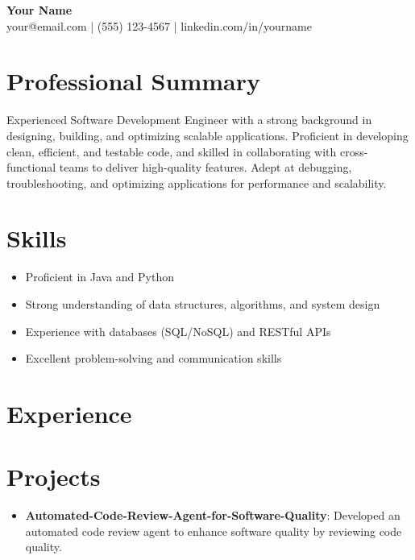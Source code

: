 \documentclass[11pt,a4paper]{article}
\begin{document}
\begin{center}
{\LARGE \textbf{Your Name}} \\[4pt]
your@email.com \quad | \quad (555) 123-4567 \quad | \quad linkedin.com/in/yourname
\end{center}

\vspace{8pt}

\section*{Professional Summary}
Experienced Software Development Engineer with a strong background in designing, building, and optimizing scalable applications. Proficient in developing clean, efficient, and testable code, and skilled in collaborating with cross-functional teams to deliver high-quality features. Adept at debugging, troubleshooting, and optimizing applications for performance and scalability.

\section*{Skills}
\begin{itemize} \item Proficient in Java and Python \item Strong understanding of data structures, algorithms, and system design \item Experience with databases (SQL/NoSQL) and RESTful APIs \item Excellent problem-solving and communication skills \end{itemize}

\section*{Experience}

\section*{Projects}
\begin{itemize} \item \textbf{Automated-Code-Review-Agent-for-Software-Quality}: Developed an automated code review agent to enhance software quality by reviewing code quality. \end{itemize}
\end{document}
